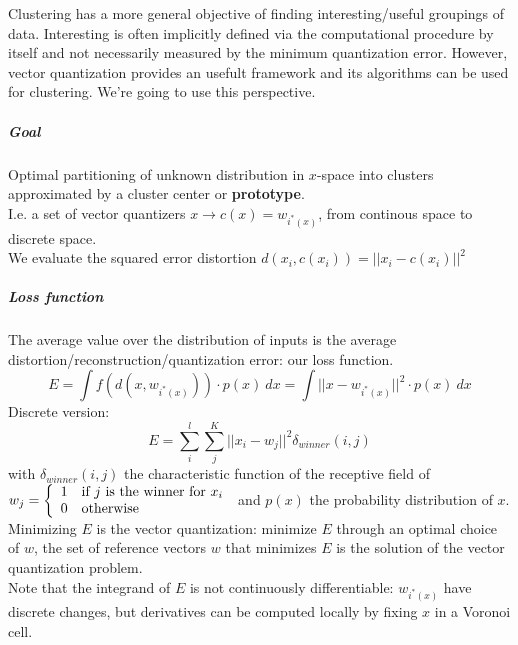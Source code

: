 \documentclass[10pt]{report}
\begin{document}
Clustering has a more general objective of finding interesting/useful groupings of data. Interesting is often implicitly defined via the computational procedure by itself and not necessarily measured by the minimum quantization error. However, vector quantization provides an usefult framework and its algorithms can be used for clustering. We're going to use this perspective.
\subparagraph{Goal} Optimal partitioning of unknown distribution in $x$-space into clusters approximated by a cluster center or \textbf{prototype}.\\
I.e. a set of vector quantizers $x\rightarrow c(x) = w_{i^*(x)}$, from continous space to discrete space.\\
We evaluate the squared error distortion $d(x_i,c(x_i)) = ||x_i-c(x_i)||^2$
\subparagraph{Loss function} The average value over the distribution of inputs is the average distortion/reconstruction/quantization error: our loss function. $$E = \int f(d(x,w_{i^*(x)}))\cdot p(x)\:dx= \int||x-w_{i^*(x)}||^2\cdot p(x)\:dx$$
Discrete version: $$E = \sum_i^l\sum_j^K||x_i-w_j||^2\delta_{winner}(i,j)$$ with $\delta_{winner}(i,j)$ the characteristic function of the receptive field of $w_j = \left\{\begin{array}{l l}
1&\text{if }j\text{ is the winner for }x_i\\
0&\text{otherwise}
\end{array}\right.$ and $p(x)$ the probability distribution of $x$.\\
Minimizing $E$ is the vector quantization: minimize $E$ through an optimal choice of $w$, the set of reference vectors $w$ that minimizes $E$ is the solution of the vector quantization problem.\\
Note that the integrand of $E$ is not continuously differentiable: $w_{i^*(x)}$ have discrete changes, but derivatives can be computed locally by fixing $x$ in a Voronoi cell.
\end{document}
